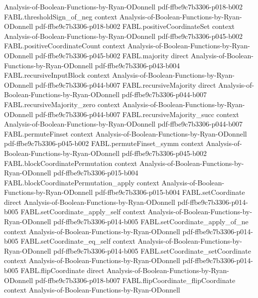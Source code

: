 \begin{theorem}
  {Analysis-of-Boolean-Functions-by-Ryan-ODonnell}
  {pdf-ffbe9c7b3306-p018-b002}
\proofstep
  {FABL.thresholdSign_of_neg}
  {context}
  {Analysis-of-Boolean-Functions-by-Ryan-ODonnell}
  {pdf-ffbe9c7b3306-p018-b002}
\proofstep
  {FABL.positiveCoordinateSet}
  {context}
  {Analysis-of-Boolean-Functions-by-Ryan-ODonnell}
  {pdf-ffbe9c7b3306-p045-b002}
\proofstep
  {FABL.positiveCoordinateCount}
  {context}
  {Analysis-of-Boolean-Functions-by-Ryan-ODonnell}
  {pdf-ffbe9c7b3306-p045-b002}
\proofstep
  {FABL.majority}
  {direct}
  {Analysis-of-Boolean-Functions-by-Ryan-ODonnell}
  {pdf-ffbe9c7b3306-p043-b004}
\proofstep
  {FABL.recursiveInputBlock}
  {context}
  {Analysis-of-Boolean-Functions-by-Ryan-ODonnell}
  {pdf-ffbe9c7b3306-p044-b007}
\proofstep
  {FABL.recursiveMajority}
  {direct}
  {Analysis-of-Boolean-Functions-by-Ryan-ODonnell}
  {pdf-ffbe9c7b3306-p044-b007}
\proofstep
  {FABL.recursiveMajority_zero}
  {context}
  {Analysis-of-Boolean-Functions-by-Ryan-ODonnell}
  {pdf-ffbe9c7b3306-p044-b007}
\proofstep
  {FABL.recursiveMajority_succ}
  {context}
  {Analysis-of-Boolean-Functions-by-Ryan-ODonnell}
  {pdf-ffbe9c7b3306-p044-b007}
\proofstep
  {FABL.permuteFinset}
  {context}
  {Analysis-of-Boolean-Functions-by-Ryan-ODonnell}
  {pdf-ffbe9c7b3306-p045-b002}
\proofstep
  {FABL.permuteFinset_symm}
  {context}
  {Analysis-of-Boolean-Functions-by-Ryan-ODonnell}
  {pdf-ffbe9c7b3306-p045-b002}
\proofstep
  {FABL.blockCoordinatePermutation}
  {context}
  {Analysis-of-Boolean-Functions-by-Ryan-ODonnell}
  {pdf-ffbe9c7b3306-p015-b004}
\proofstep
  {FABL.blockCoordinatePermutation_apply}
  {context}
  {Analysis-of-Boolean-Functions-by-Ryan-ODonnell}
  {pdf-ffbe9c7b3306-p015-b004}
\proofstep
  {FABL.setCoordinate}
  {direct}
  {Analysis-of-Boolean-Functions-by-Ryan-ODonnell}
  {pdf-ffbe9c7b3306-p014-b005}
\proofstep
  {FABL.setCoordinate_apply_self}
  {context}
  {Analysis-of-Boolean-Functions-by-Ryan-ODonnell}
  {pdf-ffbe9c7b3306-p014-b005}
\proofstep
  {FABL.setCoordinate_apply_of_ne}
  {context}
  {Analysis-of-Boolean-Functions-by-Ryan-ODonnell}
  {pdf-ffbe9c7b3306-p014-b005}
\proofstep
  {FABL.setCoordinate_eq_self}
  {context}
  {Analysis-of-Boolean-Functions-by-Ryan-ODonnell}
  {pdf-ffbe9c7b3306-p014-b005}
\proofstep
  {FABL.setCoordinate_setCoordinate}
  {context}
  {Analysis-of-Boolean-Functions-by-Ryan-ODonnell}
  {pdf-ffbe9c7b3306-p014-b005}
\proofstep
  {FABL.flipCoordinate}
  {direct}
  {Analysis-of-Boolean-Functions-by-Ryan-ODonnell}
  {pdf-ffbe9c7b3306-p018-b007}
\proofstep
  {FABL.flipCoordinate_flipCoordinate}
  {context}
  {Analysis-of-Boolean-Functions-by-Ryan-ODonnell}

\end{theorem}
